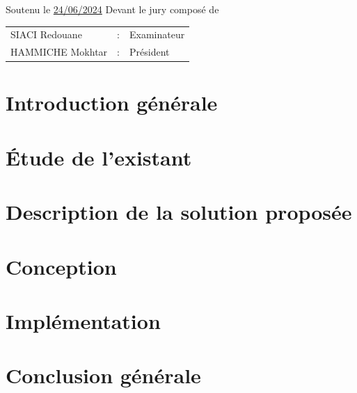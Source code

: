 \documentclass[12pt,a4paper]{report}
\begin{document}
\begin{titlepage}
\begin{center}
    {\normalsize Soutenu le \underline{24/06/2024} Devant le jury composé de} \\
    \vspace{0.4cm}
    \begin{tabular}{lll}
        SIACI Redouane & : & Examinateur \\
        HAMMICHE Mokhtar & : & Président \\
    \end{tabular}
\end{center}
\end{titlepage}





\tableofcontents
\listoffigures
\listoftables

\chapter*{Introduction générale}



\chapter{Étude de l'existant}


\chapter{Description de la solution proposée}



\chapter{Conception}


\chapter{Implémentation}


\chapter*{Conclusion générale}

\end{document}
